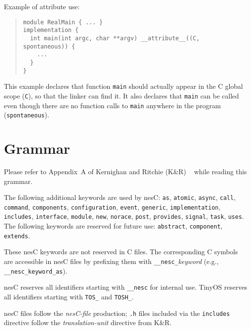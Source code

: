 \documentclass[11pt,letterpaper]{article}
\newcommand{\kw}[1]{{\tt #1}}
\newcommand{\code}[1]{{\tt #1}}
\newcommand{\file}[1]{{\tt #1}}
\newcommand{\nesc}{nesC\xspace}
\newcommand{\tinyos}{TinyOS\xspace}
\begin{document}
Example of attribute use:
\begin{quote} \begin{verbatim}
module RealMain { ... }
implementation {
  int main(int argc, char **argv) __attribute__((C, spontaneous)) {
    ...
  }
}
\end{verbatim} \end{quote}

This example declares that function \code{main} should actually appear
in the C global scope (\code{C}), so that the linker can find it. It
also declares that \code{main} can be called even though there are no
function calls to \code{main} anywhere in the program
(\code{spontaneous}). 

\appendix

\section{Grammar}
\label{sec:grammar}

Please refer to  Appendix~A of Kernighan and Ritchie (K\&R)
~\cite[pp234--239]{kandr} while reading this grammar.

The following additional keywords are used by \nesc: \kw{as}, \kw{atomic},
\kw{async}, \kw{call}, \kw{command}, \kw{components}, \kw{configuration},
\kw{event}, \kw{generic}, \kw{implementation}, \kw{includes},
\kw{interface}, \kw{module}, \kw{new}, \kw{norace}, \kw{post},
\kw{provides}, \kw{signal}, \kw{task}, \kw{uses}. The following keywords
are reserved for future use: \kw{abstract}, \kw{component}, \kw{extends}.

These \nesc keywords are not reserved in C files. The corresponding C
symbols are accessible in \nesc files by prefixing them with
\kw{\_\_nesc\_}\emph{keyword} (e.g., \kw{\_\_nesc\_keyword\_as}).

\nesc reserves all identifiers starting with \kw{\_\_nesc} for internal
use. \tinyos reserves all identifiers starting with \kw{TOS\_} and
\kw{TOSH\_}.

\nesc files follow the \emph{nesC-file} production; \file{.h} files included
via the \kw{includes} directive follow the \emph{translation-unit}
directive from K\&R. 
\end{document}

